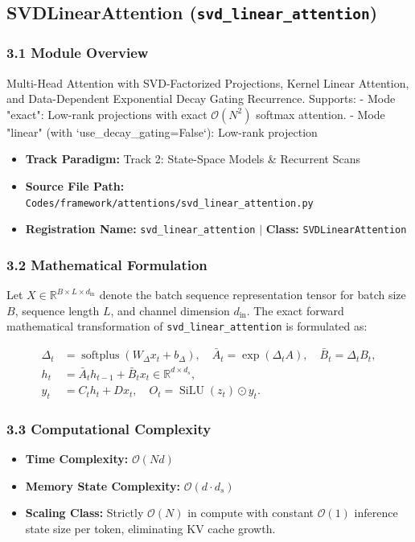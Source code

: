 \subsection{SVDLinearAttention (\texttt{svd\_linear\_attention})}
\label{sec:app_module_svd\_linear\_attention}

\subsubsection*{3.1 Module Overview}
Multi-Head Attention with SVD-Factorized Projections, Kernel Linear Attention, and Data-Dependent Exponential Decay Gating Recurrence.  Supports: - Mode "exact": Low-rank projections with exact $\mathcal{O}(N^2)$ softmax attention. - Mode "linear" (with `use\_decay\_gating=False`): Low-rank projection
\begin{itemize}
    \item \textbf{Track Paradigm:} Track 2: State-Space Models & Recurrent Scans
    \item \textbf{Source File Path:} \texttt{Codes/framework/attentions/svd\_linear\_attention.py}
    \item \textbf{Registration Name:} \texttt{svd\_linear\_attention} $\mid$ \textbf{Class:} \texttt{SVDLinearAttention}
\end{itemize}

\subsubsection*{3.2 Mathematical Formulation}
Let $X \in \mathbb{R}^{B \times L \times d_{\text{in}}}$ denote the batch sequence representation tensor for batch size $B$, sequence length $L$, and channel dimension $d_{\text{in}}$. The exact forward mathematical transformation of \texttt{svd\_linear\_attention} is formulated as:

\begin{align}
\Delta_t &= \operatorname{softplus}(W_\Delta x_t + b_\Delta), \quad \bar{A}_t = \exp(\Delta_t A), \quad \bar{B}_t = \Delta_t B_t, \\
h_t &= \bar{A}_t h_{t-1} + \bar{B}_t x_t \in \mathbb{R}^{d \times d_s}, \\
y_t &= C_t h_t + D x_t, \quad O_t = \operatorname{SiLU}(z_t) \odot y_t.
\end{align}


\subsubsection*{3.3 Computational Complexity}
\begin{itemize}
    \item \textbf{Time Complexity:} $\mathcal{O}(N d)$
    \item \textbf{Memory State Complexity:} $\mathcal{O}(d \cdot d_s)$
    \item \textbf{Scaling Class:} Strictly $\mathcal{O}(N)$ in compute with constant $\mathcal{O}(1)$ inference state size per token, eliminating KV cache growth.
\end{itemize}

